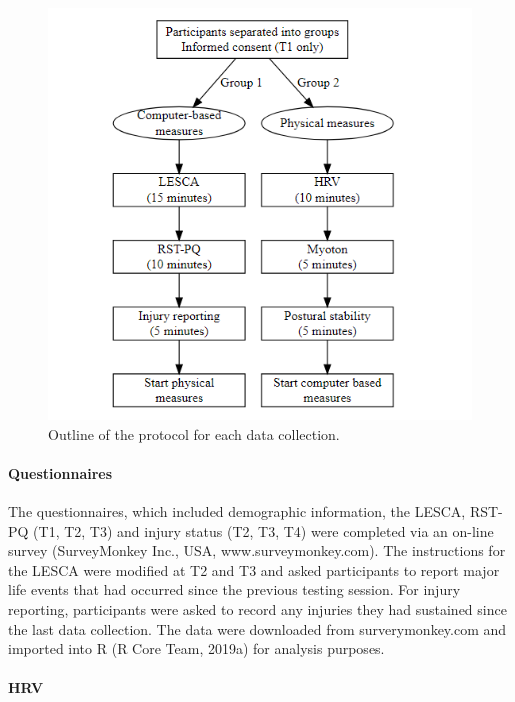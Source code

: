 \documentclass[man,floatsintext]{apa6}
\let\oldparagraph\paragraph
\renewcommand{\paragraph}[1]{\oldparagraph{#1}\mbox{}}
\begin{document}
\begin{figure}

{\centering \includegraphics[width=1\linewidth]{figs/study1/sessionprotocol} 

}

\caption{Outline of the protocol for each data collection.}\label{fig:session-protocol}
\end{figure}

\hypertarget{questionnaires}{%
\paragraph{Questionnaires}\label{questionnaires}}

The questionnaires, which included demographic information, the LESCA, RST-PQ (T1, T2, T3) and injury status (T2, T3, T4) were completed via an on-line survey (SurveyMonkey Inc., USA, www.surveymonkey.com).
The instructions for the LESCA were modified at T2 and T3 and asked participants to report major life events that had occurred since the previous testing session.
For injury reporting, participants were asked to record any injuries they had sustained since the last data collection.
The data were downloaded from surverymonkey.com and imported into R (R Core Team, 2019a) for analysis purposes.

\hypertarget{hrv}{%
\paragraph{HRV}\label{hrv}}
\end{document}
